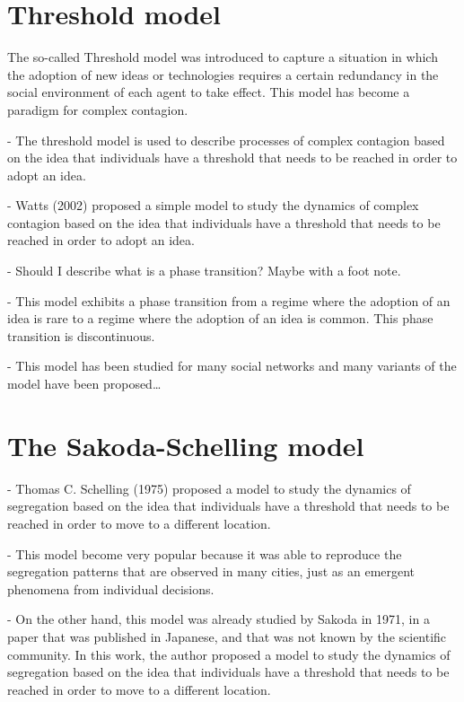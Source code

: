 \section{\label{sec:Threshold model} Threshold model}

The so-called Threshold model was introduced to capture a situation in which the adoption of new ideas or technologies requires a certain redundancy in the social environment of each agent to take effect. This model has become a paradigm for complex contagion.

- The threshold model is used to describe processes of complex contagion based on the idea that individuals have a threshold that needs to be reached in order to adopt an idea.

- Watts (2002) proposed a simple model to study the dynamics of complex contagion based on the idea that individuals have a threshold that needs to be reached in order to adopt an idea. 

- Should I describe what is a phase transition? Maybe with a foot note.

- This model exhibits a phase transition from a regime where the adoption of an idea is rare to a regime where the adoption of an idea is common. This phase transition is discontinuous.

- This model has been studied for many social networks and many variants of the model have been proposed\dots

\section{\label{The Sakoda-Schelling model} The Sakoda-Schelling model}

- Thomas C. Schelling (1975) proposed a model to study the dynamics of segregation based on the idea that individuals have a threshold that needs to be reached in order to move to a different location. 

- This model become very popular because it was able to reproduce the segregation patterns that are observed in many cities, just as an emergent phenomena from individual decisions.

- On the other hand, this model was already studied by Sakoda in 1971, in a paper that was published in Japanese, and that was not known by the scientific community. In this work, the author proposed a model to study the dynamics of segregation based on the idea that individuals have a threshold that needs to be reached in order to move to a different location.

